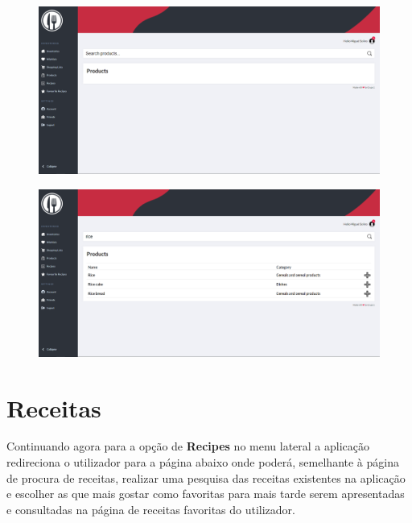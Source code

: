 \documentclass[a4paper]{report}
\begin{document}
    \begin{figure}[H]
        \centering
            \includegraphics[width=\textwidth]{images/produto_final/procura_de_produtos.png}
    \end{figure}

    \begin{figure}[H]
        \centering
            \includegraphics[width=\textwidth]{images/produto_final/procura_de_produtos_efetuada.png}
    \end{figure}

    \section{Receitas}

    Continuando agora para a opção de \textbf{Recipes} no menu lateral a 
    aplicação redireciona o utilizador para a página abaixo onde poderá,
    semelhante à página de procura de receitas, realizar uma pesquisa
    das receitas existentes na aplicação e escolher as que mais gostar
    como favoritas para mais tarde serem apresentadas e consultadas na
    página de receitas favoritas do utilizador.
\end{document}
